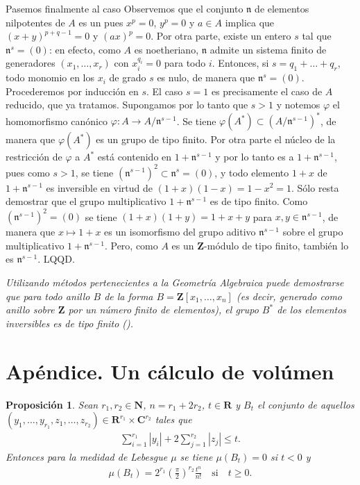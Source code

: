 \documentclass[bibtotoc,leqno,spanish]{amsbook}
\let\emph\relax %
\newcommand{\RR}{\mathbf{R}}
\newcommand{\ZZ}{\mathbf{Z}}
\newcommand{\NN}{\mathbf{N}}
\newcommand{\CC}{\mathbf{C}}
\newcommand{\idl}[1]{\mathfrak{#1}}
\newcommand{\QED}{LQQD.}
\newcommand{\abs}[1]{\left\lvert#1\right\rvert}
\renewcommand{\to}[1][]{\xrightarrow{#1}}
\numberwithin{equation}{section}
\newenvironment{comm}%
	{\begin{list}{}{\setlength{\leftmargin}{2\parindent}\setlength{\topsep}{\baselineskip}}\item\itshape}
	{\end{list}}
\theoremstyle{note}
\theoremstyle{note}
\newtheorem*{proposition*}{Proposici\'on}
\theoremstyle{rem}
\numberwithin{theorem}{section}
\numberwithin{proposition}{section}
\numberwithin{definition}{section}
\numberwithin{lemma}{section}
\numberwithin{corollary}{section}
\numberwithin{example}{section}
\numberwithin{footnote}{section}%
\begin{document}
Pasemos finalmente al caso \emph{general.} Observemos que el conjunto $\idl{n}$ de elementos nilpotentes de $A$
es un \emph{ideal,} pues $x^{p}=0$, $y^{p}=0$ y $a\in A$ implica que $(x+y)^{p+q-1}=0$ y $(ax)^{p}=0$. Por otra parte,
existe un entero $s$ tal que $\idl{n}^{s}=(0)$: en efecto, como $A$ es noetheriano, $\idl{n}$ admite un sistema
finito de generadores $(x_{1},\dots,x_{r})$ con $x_{i}^{q_{i}}=0$ para todo $i$. Entonces, si $s = q_{1}+\dots+q_{r}$,
todo monomio en los $x_{i}$ de grado $s$ es nulo, de manera que $\idl{n}^{s}=(0)$. Procederemos por inducci\'on
en $s$. El caso $s=1$ es precisamente el caso de $A$ reducido, que ya tratamos. Supongamos por lo tanto que
$s>1$ y notemos $\varphi$ el homomorfismo can\'onico $\varphi:A\to A/\idl{n}^{s-1}$. Se tiene
$\varphi(A^{*})\subset(A/\idl{n}^{s-1})^{*}$, de manera que $\varphi(A^{*})$ es un grupo de tipo finito. Por
otra parte el n\'ucleo de la restricci\'on de $\varphi$ a $A^{*}$ est\'a contenido en $1+\idl{n}^{s-1}$ y
por lo tanto es \emph{igual} a $1+\idl{n}^{s-1}$, pues como $s>1$, se tiene $(\idl{n}^{s-1})^{2}\subset\idl{n}^{s}=(0)$,
y todo elemento $1+x$ de $1+\idl{n}^{s-1}$ es inversible en virtud de
$(1+x)(1-x) = 1-x^{2}=1$. S\'olo resta demostrar que el grupo multiplicativo $1+\idl{n}^{s-1}$ es de tipo finito.
Como $(\idl{n}^{s-1})^{2}=(0)$ se tiene $(1+x)(1+y) = 1+x+y$ para $x,y\in\idl{n}^{s-1}$, de manera que
$x\mapsto 1+x$ es un isomorfismo del grupo aditivo $\idl{n}^{s-1}$ sobre el grupo multiplicativo $1+\idl{n}^{s-1}$.
Pero, como $A$ es un $\ZZ$-m\'odulo de tipo finito, tambi\'en lo es $\idl{n}^{s-1}$. \QED

\begin{comm}
Utilizando m\'etodos pertenecientes a la Geometr\'ia Algebraica puede demostrarse que para todo anillo
\emph{reducido} $B$ de la forma $B = \ZZ[x_{1},\dots,x_{n}]$ (es decir, generado como anillo sobre $\ZZ$ por un
n\'umero finito de elementos), el grupo $B^{*}$ de los elementos inversibles es de tipo finito (\cite{Samuel1}).
\end{comm}

\section*[Un c\'alculo de vol\'umen]{Ap\'endice. Un c\'alculo de vol\'umen}

\begin{proposition*}
Sean $r_{1},r_{2}\in\NN$, $n=r_{1}+2r_{2}$, $t\in\RR$ y $B_{t}$ el conjunto de aquellos
$(y_{1},\dots,y_{r_{1}},z_{1},\dots,z_{r_{2}})\in\RR^{r_{1}}\times\CC^{r_{2}}$ tales que
\begin{gather}
\sum_{i=1}^{r_{1}}\abs{y_{i}}+2\sum_{j=1}^{r_{2}}\abs{z_{j}}\leq t.
\end{gather}
Entonces para la medidad de Lebesgue $\mu$ se tiene $\mu(B_{t})=0$ si $t < 0$ y
\begin{gather}\label{eq-4-ap-2}
\mu(B_{t}) = 2^{r_{1}}\left(\frac{\pi}{2}\right)^{r_{2}}\frac{t^{n}}{n!}\quad\text{si}\quad t\geq 0.
\end{gather}
\end{proposition*}
\end{document}
